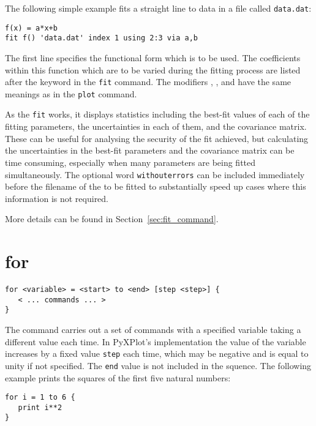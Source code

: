 The following simple example fits a straight line to data in
a file called {\tt data.dat}:

\begin{verbatim}
f(x) = a*x+b
fit f() 'data.dat' index 1 using 2:3 via a,b
\end{verbatim}

\noindent The first line specifies the functional form which is to be used.
The coefficients within this function which are to be varied during the fitting
process are listed after the keyword  in the {\tt fit} command.
The modifiers , ,  and
 have the same meanings as in the {\tt plot} command.

As the {\tt fit} works, it displays statistics including the best-fit values of
each of the fitting parameters, the uncertainties in each of them, and the
covariance matrix. These can be useful for analysing the security of the fit
achieved, but calculating the uncertainties in the best-fit parameters and the
covariance matrix can be time consuming, especially when many parameters are
being fitted simultaneously. The optional word {\tt withouterrors} can be
included immediately before the filename of the \datafile to be fitted to
substantially speed up cases where this information is not required.

More details can be found in Section~\ref{sec:fit_command}.


\section{for}

\begin{verbatim}
for <variable> = <start> to <end> [step <step>] {
   < ... commands ... >
}
\end{verbatim}

The  command carries out a set of commands with a specified
variable taking a different value each time.  In PyXPlot's implementation the
value of the variable increases by a fixed value {\tt step} each time, which may
be negative and is equal to unity if not specified.  The {\tt end} value is not
included in the squence.  The following example prints the squares of the first
five natural numbers:

\begin{verbatim}
for i = 1 to 6 {
   print i**2
}
\end{verbatim}


